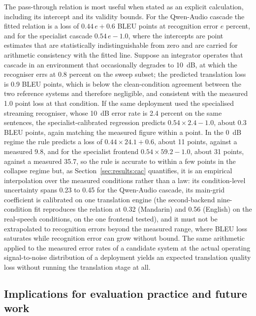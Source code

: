 The pass-through relation is most useful when stated as an explicit
calculation, including its intercept and its validity bounds. For the
Qwen-Audio cascade the fitted relation is a loss of $0.44\,e + 0.6$ BLEU
points at recognition error $e$ percent, and for the specialist cascade
$0.54\,e - 1.0$, where the intercepts are point estimates that are
statistically indistinguishable from zero and are carried for arithmetic
consistency with the fitted line. Suppose an integrator operates that
cascade in an environment that
occasionally degrades to 10~dB, at which the recogniser errs at 0.8 percent
on the sweep subset; the predicted translation loss is 0.9 BLEU points,
which is below the clean-condition agreement between the two reference
systems and therefore negligible, and consistent with the measured 1.0
point loss at that condition. If the same deployment used the specialised
streaming recogniser, whose 10~dB error rate is 2.4 percent on the same
sentences, the specialist-calibrated regression predicts $0.54 \times 2.4 -
1.0$, about 0.3 BLEU points, again matching the measured figure within a
point. In the 0~dB regime the rule predicts a loss of $0.44 \times 24.1 +
0.6$, about 11 points, against a measured 9.8, and for the specialist
frontend $0.54 \times 59.2 - 1.0$, about 31 points, against a measured
35.7, so the rule is accurate to within a few points in the collapse
regime but, as Section~\ref{sec:results:cac} quantifies, it is an
empirical interpolation over the measured conditions rather than a law:
its condition-level uncertainty spans 0.23 to 0.45 for the Qwen-Audio
cascade, its main-grid coefficient is calibrated on one translation
engine (the second-backend nine-condition fit reproduces the relation at
0.32 (Mandarin) and 0.56 (English) on the real-speech conditions, on the
one frontend tested), and it must not be
extrapolated to recognition errors beyond the measured range, where BLEU
loss saturates while recognition error can grow without bound. The same
arithmetic applied to the measured
error rates of a candidate system at the actual operating signal-to-noise
distribution of a deployment yields an expected translation quality loss
without running the translation stage at all.

\subsection{Implications for evaluation practice and future work}

